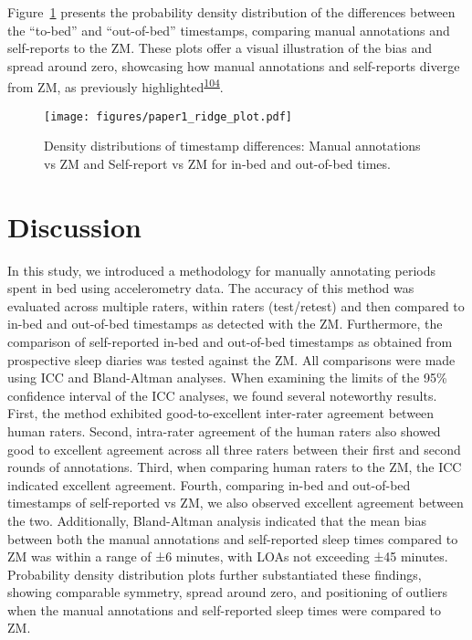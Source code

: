 \documentclass[
  10pt,
]{scrbook}
\begin{document}
Figure~\ref{fig-ridge_plot} presents the probability density
distribution of the differences between the ``to-bed'' and
``out-of-bed'' timestamps, comparing manual annotations and self-reports
to the ZM. These plots offer a visual illustration of the bias and
spread around zero, showcasing how manual annotations and self-reports
diverge from ZM, as previously
highlighted\textsuperscript{\protect\hyperlink{ref-van_hees_estimating_2018}{104}}.

\begin{figure}

{\centering \texttt{[image: figures/paper1\_ridge\_plot.pdf]}

}

\caption{\label{fig-ridge_plot}Density distributions of timestamp
differences: Manual annotations vs ZM and Self-report vs ZM for in-bed
and out-of-bed times.}

\end{figure}

\hypertarget{discussion}{%
\section{Discussion}\label{discussion}}

In this study, we introduced a methodology for manually annotating
periods spent in bed using accelerometry data. The accuracy of this
method was evaluated across multiple raters, within raters (test/retest)
and then compared to in-bed and out-of-bed timestamps as detected with
the ZM. Furthermore, the comparison of self-reported in-bed and
out-of-bed timestamps as obtained from prospective sleep diaries was
tested against the ZM. All comparisons were made using ICC and
Bland-Altman analyses. When examining the limits of the 95\% confidence
interval of the ICC analyses, we found several noteworthy results.
First, the method exhibited good-to-excellent inter-rater agreement
between human raters. Second, intra-rater agreement of the human raters
also showed good to excellent agreement across all three raters between
their first and second rounds of annotations. Third, when comparing
human raters to the ZM, the ICC indicated excellent agreement. Fourth,
comparing in-bed and out-of-bed timestamps of self-reported vs ZM, we
also observed excellent agreement between the two. Additionally,
Bland-Altman analysis indicated that the mean bias between both the
manual annotations and self-reported sleep times compared to ZM was
within a range of ±6 minutes, with LOAs not exceeding ±45 minutes.
Probability density distribution plots further substantiated these
findings, showing comparable symmetry, spread around zero, and
positioning of outliers when the manual annotations and self-reported
sleep times were compared to ZM.
\end{document}
